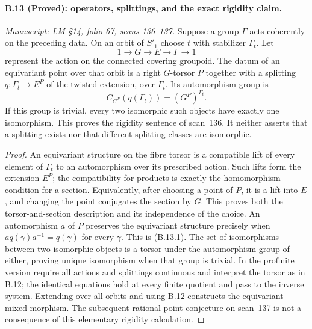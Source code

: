 \paragraph{B.13 (Proved): operators, splittings, and the exact rigidity claim.}\label{B13}
\textit{Manuscript: LM \S14, folio 67, scans 136--137.}
Suppose a group $\Gamma$ acts coherently on the preceding
data. On an orbit of $S'_1$ choose $t$ with stabilizer
$\Gamma_t$. Let
\[
 1\longrightarrow G\longrightarrow E\longrightarrow\Gamma
       \longrightarrow1
\]
represent the action on the connected covering groupoid.
The datum of an equivariant point over that orbit is a
right $G$-torsor $P$ together with a splitting
$q:\Gamma_t\to E^P$ of the twisted extension, over
$\Gamma_t$. Its automorphism group is
\[
 C_{G^P}(q(\Gamma_t))=(G^P)^{\Gamma_t}.                    \tag{B.13.1}
\]
If this group is trivial, every two isomorphic such
objects have exactly one isomorphism. This proves the
rigidity sentence of scan~136. It neither asserts that
a splitting exists nor that different splitting classes
are isomorphic.

\begin{proof}
An equivariant structure on the fibre torsor is a
compatible lift of every element of $\Gamma_t$ to an
automorphism over its prescribed action. Such lifts
form the extension $E^P$; the compatibility for
products is exactly the homomorphism condition for
a section. Equivalently, after choosing a point of
$P$, it is a lift into $E$, and changing the point
conjugates the section by $G$. This proves both the
torsor-and-section description and its independence
of the choice. An automorphism $a$ of $P$ preserves
the equivariant structure precisely when
$a q(\gamma)a^{-1}=q(\gamma)$ for every $\gamma$.
This is (B.13.1). The set of isomorphisms between two
isomorphic objects is a torsor under the automorphism
group of either, proving unique isomorphism when that
group is trivial. In the profinite version require
all actions and splittings continuous and interpret
the torsor as in B.12; the identical equations hold
at every finite quotient and pass to the inverse
system. Extending over all orbits and using B.12
constructs the equivariant mixed morphism. The
subsequent rational-point conjecture on scan~137 is
not a consequence of this elementary rigidity
calculation.
\end{proof}
